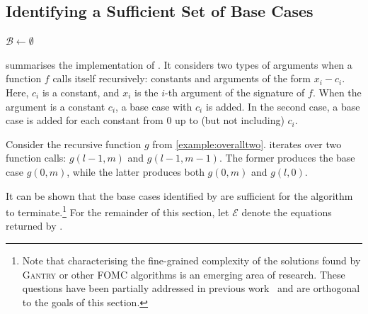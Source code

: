 \documentclass[a4paper,UKenglish,cleveref, autoref, thm-restate]{lipics-v2021}
\newcommand{\Cranetwo}{\textsc{Gantry}}
\begin{document}

\subsection{Identifying a Sufficient Set of Base Cases}\label{sec:identifying}


\begin{algorithm}[t]
  \caption{\protect{}}\label{alg:findbasecases}

  $\mathcal{B} \gets \emptyset$\;
\end{algorithm}

 summarises the implementation of \FindBaseCases. It
considers two types of arguments when a function $f$ calls itself recursively:
constants and arguments of the form $x_{i} - c_{i}$. Here, $c_{i}$ is a
constant, and $x_{i}$ is the $i$-th argument of the signature of $f$. When the
argument is a constant $c_{i}$, a base case with $c_{i}$ is added. In the second
case, a base case is added for each constant from $0$ up to (but not including)
$c_{i}$.

\begin{example}
  Consider the recursive function $g$ from \cref{example:overalltwo}.
  \FindBaseCases iterates over two function calls: $g(l-1, m)$ and
  $g(l-1, m-1)$. The former produces the base case $g(0, m)$, while the latter
  produces both $g(0, m)$ and $g(l, 0)$.
\end{example}

It can be shown that the base cases identified by \FindBaseCases are sufficient
for the algorithm to terminate.\footnote{Note that characterising the
  fine-grained complexity of the solutions found by \Cranetwo{} or other FOMC
  algorithms is an emerging area of research. These questions have been
  partially addressed in previous
  work~\cite{DBLP:conf/kr/DilkasB23,tóth2024complexityweightedfirstordermodel}
  and are orthogonal to the goals of this section.} For the remainder of this
section, let $\mathcal{E}$ denote the equations returned by
\CompileWithBaseCases.
\end{document}
